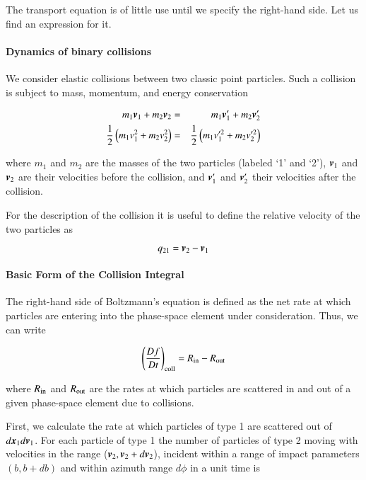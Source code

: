 The transport equation is of little use until we specify the right-hand side. Let us find an expression for it.

\paragraph{Dynamics of binary collisions}

We consider elastic collisions between two classic point particles. Such a collision is subject to mass, momentum, and energy conservation

\begin{eqnarray}
m_1{\boldsymbol{v}}_1 + m_2{\boldsymbol{v}}_2 &=& m_1{\boldsymbol{v}}_1^\prime + m_2{\boldsymbol{v}}_2^\prime\\
\frac{1}{2}\left( m_1v^2_1 + m_2v^2_2 \right) &=& \frac{1}{2}\left(m_1v_1^{\prime 2} + m_2v_2^{\prime 2}\right)
\end{eqnarray}

where $m_1$ and $m_2$ are the masses of the two particles (labeled ‘1’ and ‘2’), ${\boldsymbol{v}}_1$ and ${\boldsymbol{v}}_2$ are their velocities before the collision, and ${\boldsymbol{v}}^\prime_1$ and ${\boldsymbol{v}}^\prime_2$ their velocities after the collision. 

For the description of the collision it is useful to define the relative velocity of the two
particles as

\begin{equation}
q_{21} = {\boldsymbol{v}}_2-{\boldsymbol{v}}_1
\end{equation}

\paragraph{Basic Form of the Collision Integral}

The right-hand side of Boltzmann's equation is defined as the net rate at which particles are entering into the phase-space element under consideration. Thus, we can write


\begin{equation}
\left(\frac{Df}{Dt}\right)_{\rm coll}  = R_{\rm in} - R_{\rm out}
\end{equation}


\noindent where $R_{\rm in}$ and $R_{\rm out}$ are the rates at which particles are scattered in and out of a given phase-space element due to collisions.

First, we calculate the rate at which particles of type 1 are scattered out of $d{\boldsymbol{x}}_1 d{\boldsymbol{v}}_1$. For each particle of type 1 the number of particles of type 2 moving with velocities in the range (${\boldsymbol{v}}_2, {\boldsymbol{v}}_2 + d{\boldsymbol{v}}_2$), incident within a range of impact parameters $(b, b + db)$ and within azimuth range $d\phi$ in a unit time is 

